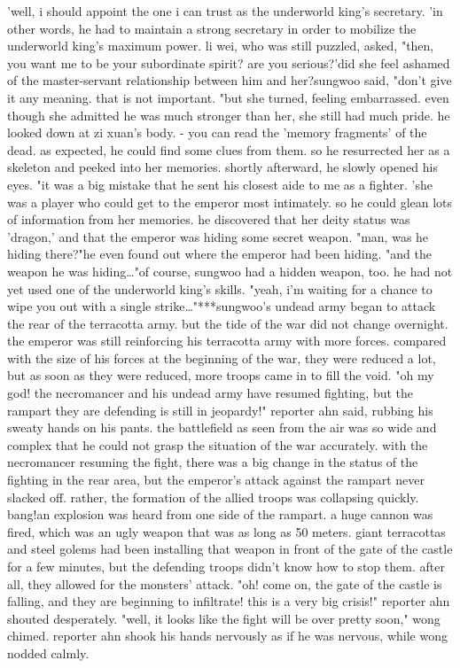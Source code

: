 'well, i should appoint the one i can trust as the underworld king's secretary.
'in other words, he had to maintain a strong secretary in order to mobilize the underworld king's maximum power.
li wei, who was still puzzled, asked, "then, you want me to be your subordinate spirit? are you serious?'did she feel ashamed of the master-servant relationship between him and her?sungwoo said, "don't give it any meaning.
 that is not important.
"but she turned, feeling embarrassed.
 even though she admitted he was much stronger than her, she still had much pride.
he looked down at zi xuan's body.
- you can read the 'memory fragments' of the dead.
as expected, he could find some clues from them.
 so he resurrected her as a skeleton and peeked into her memories.
shortly afterward, he slowly opened his eyes.
"it was a big mistake that he sent his closest aide to me as a fighter.
'she was a player who could get to the emperor most intimately.
 so he could glean lots of information from her memories.
he discovered that her deity status was 'dragon,' and that the emperor was hiding some secret weapon.
"man, was he hiding there?"he even found out where the emperor had been hiding.
"and the weapon he was hiding…"of course, sungwoo had a hidden weapon, too.
 he had not yet used one of the underworld king's skills.
"yeah, i'm waiting for a chance to wipe you out with a single strike…"***sungwoo's undead army began to attack the rear of the terracotta army.
 but the tide of the war did not change overnight.
the emperor was still reinforcing his terracotta army with more forces.
 compared with the size of his forces at the beginning of the war, they were reduced a lot, but as soon as they were reduced, more troops came in to fill the void.
"oh my god! the necromancer and his undead army have resumed fighting, but the rampart they are defending is still in jeopardy!" reporter ahn said, rubbing his sweaty hands on his pants.
the battlefield as seen from the air was so wide and complex that he could not grasp the situation of the war accurately.
with the necromancer resuming the fight, there was a big change in the status of the fighting in the rear area, but the emperor's attack against the rampart never slacked off.
 rather, the formation of the allied troops was collapsing quickly.
bang!an explosion was heard from one side of the rampart.
 a huge cannon was fired, which was an ugly weapon that was as long as 50 meters.
giant terracottas and steel golems had been installing that weapon in front of the gate of the castle for a few minutes, but the defending troops didn't know how to stop them.
 after all, they allowed for the monsters' attack.
"oh! come on, the gate of the castle is falling, and they are beginning to infiltrate! this is a very big crisis!" reporter ahn shouted desperately.
"well, it looks like the fight will be over pretty soon," wong chimed.
reporter ahn shook his hands nervously as if he was nervous, while wong nodded calmly.



